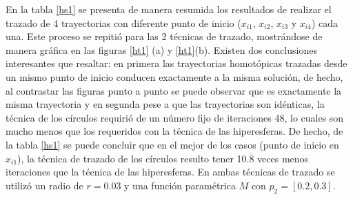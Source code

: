 \documentclass[conference,letterpaper,twocolumn]{IEEEtran}
\begin{document}
En la tabla \ref{hs1} se presenta de manera resumida los
resultados de realizar el trazado de 4 trayectorias con diferente punto de inicio ($x_{i1}$, $x_{i2}$, $x_{i3}$ y $x_{i4}$) cada una.
Este proceso se repitió para las 2 técnicas de trazado, mostrándose de manera gráfica en las figuras \ref{ht1} (a) y \ref{ht1}(b). Existen dos conclusiones interesantes que resaltar: en primera las trayectorias
homotópicas trazadas desde un mismo punto de inicio conducen exactamente a la misma solución, de hecho,
al contrastar las figuras punto a punto se puede observar que es exactamente la misma trayectoria y
en segunda pese a que las trayectorias son idénticas, la técnica de los círculos requirió de un número fijo de iteraciones 48, lo cuales son mucho menos que los requeridos con la técnica de las hiperesferas. De hecho, de la tabla \ref{hs1} se puede concluir que en el mejor
de los casos (punto de inicio en $x_{i1}$), la técnica de trazado de los círculos resulto tener 10.8 veces menos iteraciones que la técnica de las hiperesferas. En ambas técnicas de trazado se utilizó un radio de $r=0.03$ y una función paramétrica $M$ con $p_2=[0.2,0.3]$.


\begin{table}[tbp]
\caption{Points Homotopy Simulations}
\label{hs1}
\end{table}
\end{document}
